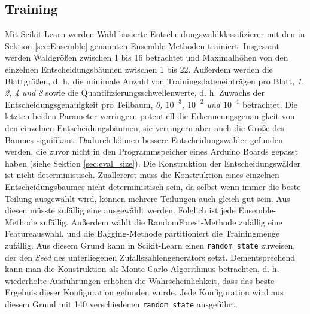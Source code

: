 \subsection{Training}
Mit Scikit-Learn werden Wahl basierte Entscheidungswaldklassifizierer mit den in Sektion \ref{sec:Ensemble} genannten Ensemble-Methoden trainiert. Insgesamt werden Waldgrößen zwischen 1 bis 16 betrachtet und
Maximalhöhen von den einzelnen Entscheidungsbäumen zwischen 1 bis 22. Außerdem werden die Blattgrößen, d. h. die minimale Anzahl von Trainingsdateneinträgen pro Blatt, \textit{1, 2, 4 und 8} sowie die
Quantifizierungsschwellenwerte, d. h. Zuwachs der Entscheidungsgenauigkeit pro Teilbaum, \textit{0, $10^{-3}$, $10^{-2}$ und $10^{-1}$} betrachtet.
\newline
\newline
Die letzten beiden Parameter verringern potentiell die Erkenneungsgenauigkeit von den einzelnen Entscheidungsbäumen, sie verringern aber auch die Größe des Baumes signifikant.
Dadurch können bessere Entscheidungswälder gefunden werden, die zuvor nicht in den Programmspeicher eines Arduino Boards gepasst haben (siehe Sektion \ref{sec:eval_size}).
\newline
\newline
Die Konstruktion der Entscheidungswälder ist nicht deterministisch. Zuallererst muss die Konstruktion eines einzelnen Entscheidungsbaumes nicht deterministisch sein, da selbst wenn immer die beste Teilung
ausgewählt wird, können mehrere Teilungen auch gleich gut sein. Aus diesen müsste zufällig eine ausgewählt werden. Folglich ist jede Ensemble-Methode zufällig. Außerdem wählt die RandomForest-Methode
zufällig eine Featureauswahl, und die Bagging-Methode partitioniert die Trainingmenge zufällig. Aus diesem Grund kann in Scikit-Learn einen \texttt{random\_state} zuweisen, der den \textit{Seed} des
unterliegenen Zufallszahlengenerators setzt.
\newline
\newline
Dementsprechend kann man die Konstruktion als Monte Carlo Algorithmus betrachten, d. h. wiederholte Ausführungen erhöhen die Wahrscheinlichkeit, dass das beste Ergebnis dieser Konfiguration gefunden wurde.
Jede Konfiguration wird aus diesem Grund mit 140 verschiedenen \texttt{random\_state} ausgeführt.

